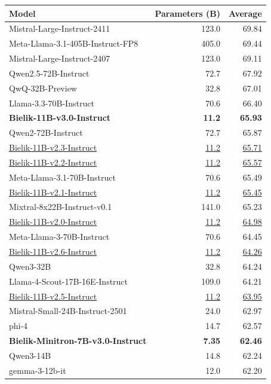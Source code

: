 \documentclass{article}
\begin{document}
\begin{table}[t]
    \centering
    \small
    \begin{tabular}{lrr}
    \toprule
    \textbf{Model} & \textbf{Parameters (B)} & \textbf{Average} \\
    \midrule
    Mistral-Large-Instruct-2411 & 123.0 & 69.84 \\
    Meta-Llama-3.1-405B-Instruct-FP8 & 405.0 & 69.44 \\
    Mistral-Large-Instruct-2407 & 123.0 & 69.11 \\
    Qwen2.5-72B-Instruct & 72.7 & 67.92 \\
    QwQ-32B-Preview & 32.8 & 67.01 \\
    Llama-3.3-70B-Instruct & 70.6 & 66.40 \\
    \textbf{Bielik-11B-v3.0-Instruct} & \textbf{11.2} & \textbf{65.93} \\
    Qwen2-72B-Instruct & 72.7 & 65.87 \\
    \underline{Bielik-11B-v2.3-Instruct} & \underline{11.2} & \underline{65.71} \\
    \underline{Bielik-11B-v2.2-Instruct} & \underline{11.2} & \underline{65.57} \\
    Meta-Llama-3.1-70B-Instruct & 70.6 & 65.49 \\
    \underline{Bielik-11B-v2.1-Instruct} & \underline{11.2} & \underline{65.45} \\
    Mixtral-8x22B-Instruct-v0.1 & 141.0 & 65.23 \\
    \underline{Bielik-11B-v2.0-Instruct} & \underline{11.2} & \underline{64.98} \\
    Meta-Llama-3-70B-Instruct & 70.6 & 64.45 \\
    \underline{Bielik-11B-v2.6-Instruct} & \underline{11.2} & \underline{64.26} \\
    Qwen3-32B & 32.8 & 64.24 \\
    Llama-4-Scout-17B-16E-Instruct & 109.0 & 64.21 \\
    \underline{Bielik-11B-v2.5-Instruct} & \underline{11.2} & \underline{63.95} \\
    Mistral-Small-24B-Instruct-2501 & 24.0 & 62.97 \\
    phi-4 & 14.7 & 62.57 \\
    \textbf{Bielik-Minitron-7B-v3.0-Instruct} & \textbf{7.35} & \textbf{62.46} \\
    Qwen3-14B & 14.8 & 62.24 \\
    gemma-3-12b-it & 12.0 & 62.20 \\

\end{tabular}
\end{table}
\end{document}
